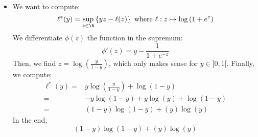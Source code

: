\documentclass[math, info]{cours}
\begin{document}
\begin{itemize}
\begin{thm}
		\end{thm}
		\begin{proof}
			Let $x \in \R^{n}$. For all $y$, the directional derivative:
			\begin{equation*}
				\partial_{y}f(x) = \lim_{\d t \to 0} \frac{f\left( x + \d t y \right) - f(x)}{\d t}
			\end{equation*}
			is a sublinear as a function of $y$.
			From the Hahn-Banach theorem, there exists $\tilde{\partial f} \in \left(\R^{n}\right)^{*} = \R^{n}$ such that:
			\begin{equation*}
				\scalar{\tilde{\partial f},\cdot }\leq \partial_{y}f(x) \leq f\left( x + y \right) - f(x), \forall y \in \R^{n}
			\end{equation*}
			Then:
			\begin{equation*}
				f(x) + f^{*}\left( \tilde{\partial f} \right) = \scalar{\tilde{\partial f}, x}
			\end{equation*}
			which completes our proof that $f^{**} = f$.
		\end{proof}

	\item We want to compute:
		\begin{equation*}
			\ell^{*}(y) = \sup_{z\in \R}\left\{ yz - \ell(z) \right\} \text{ where } \ell: z\mapsto \log\left( 1 + e^{z} \right)
		\end{equation*}
		We differentiate $\phi(z)$ the function in the supremum:
		\begin{equation*}
			\phi'(z) = y - \frac{1}{1 + e^{-z}}
		\end{equation*}
		Then, we find $z = \log\left( \frac{y}{1-y} \right)$, which only makes sense for $y \in ]0, 1[$.
		Finally, we compute:
		\begin{equation*}
			\begin{aligned}
				\ell^{*}(y) =& y\log\left( \frac{y}{1-y} \right) + \log(1 - y)\\
				=& -y\log(1 - y) + y\log(y) + \log(1 - y)\\
				=& \left( 1 - y \right)\log\left( 1 - y \right) + \left( y \right)\log(y)
			\end{aligned}
		\end{equation*}
		In the end,
		\begin{equation*}
			\boxed{\left( 1 - y \right)\log\left( 1 - y \right) + \left( y \right)\log\left( y \right)}
		\end{equation*}
\end{itemize}
\end{document}
